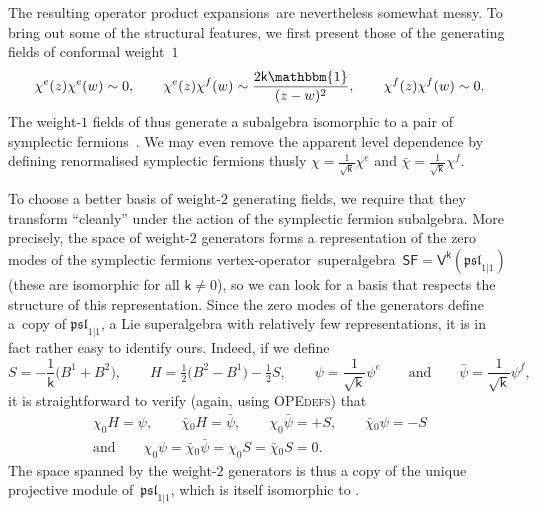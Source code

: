 \documentclass[pdftex]{sigma}
\numberwithin{equation}{section}
\newcommand{\wun}{\mathbbm{1}} %
\newcommand{\bchi}{\bar{\chi}{}} %
\newcommand{\bpsi}{\bar{\psi}{}} %
\newcommand{\kk}{\mathsf{k}} %
\newcommand{\alg}[1]{\mathfrak{#1}} %
\newcommand{\VOA}[1]{\mathsf{#1}} %
\newcommand{\SLSA}[3]{\alg{#1}_{#2 \vert #3}} %
\newcommand{\pslone}{\SLSA{psl}{1}{1}}
\newcommand{\sfsymb}{\VOA{SF}}
\newcommand{\sfvoa}{\sfsymb} %
\newcommand{\uaff}[2]{\VOA{V}^{#1}(#2)} %
\newcommand{\uwalg}[2]{\VOA{W}^{#1}_{\mathrm{#2}}} %
\newcommand{\upr}[1][\kk]{\uwalg{#1}{pr}} %
\newcommand{\vo}{vertex-operator}
\newcommand{\svoa}{\vo\ superalgebra}
\newcommand{\ope}{operator product expansion}
\newcommand{\opes}{\ope s}
\begin{document}
The resulting \opes\ are nevertheless somewhat messy.
To bring out some of the structural features, we first present those of the generating fields of conformal weight~$1$
\[
	\chi^e(z) \chi^e(w) \sim 0, \qquad \chi^e(z) \chi^f(w) \sim \frac{2\kk\wun}{(z-w)^2}, \qquad \chi^f(z) \chi^f(w) \sim 0.
\]
The weight-$1$ fields of \smash{$\upr$} thus generate a subalgebra isomorphic to a pair of symplectic fermions~\cite{KauSym00}.
We may even remove the apparent level dependence by defining renormalised symplectic fermions thusly
$\chi = \frac{1}{\sqrt{\kk}} \chi^e $ and $\bchi = \frac{1}{\sqrt{\kk}} \chi^f$.


To choose a better basis of weight-$2$ generating fields, we require that they transform ``cleanly'' under the action of the symplectic fermion subalgebra.
More precisely, the space of weight-$2$ generators forms a representation of the zero modes of the symplectic fermions \svoa\ $\sfvoa = \uaff{\kk}{\pslone}$ (these are isomorphic for all $\kk\ne0$), so we can look for a basis that respects the structure of this representation.
Since the zero modes of the generators define a~copy of $\pslone$, a Lie superalgebra with relatively few representations, it is in fact rather easy to identify ours.
Indeed, if we define
\[
	S = -\frac{1}{\kk}\big(B^1+B^2\big), \qquad H = \tfrac{1}{2}\big(B^2-B^1\big) - \tfrac{1}{2}S, \qquad
	\psi = \frac{1}{\sqrt{\kk}}\psi^e \qquad \text{and} \qquad \bpsi = \frac{1}{\sqrt{\kk}}\psi^f,
\]
it is straightforward to verify (again, using \textsc{OPEdefs}) that
\begin{gather*}
	\chi_0 H = \psi, \qquad \bchi_0 H = \bpsi, \qquad
	\chi_0 \bpsi = +S, \qquad \bchi_0 \psi = -S \\ \text{and} \qquad
	\chi_0 \psi = \bchi_0 \bpsi = \chi_0 S = \bchi_0 S = 0.
\end{gather*}
The space spanned by the weight-$2$ generators is thus a copy of the unique projective module of~$\pslone$, which is itself isomorphic to \smash{$\envalg{\pslone}$}.
\end{document}
